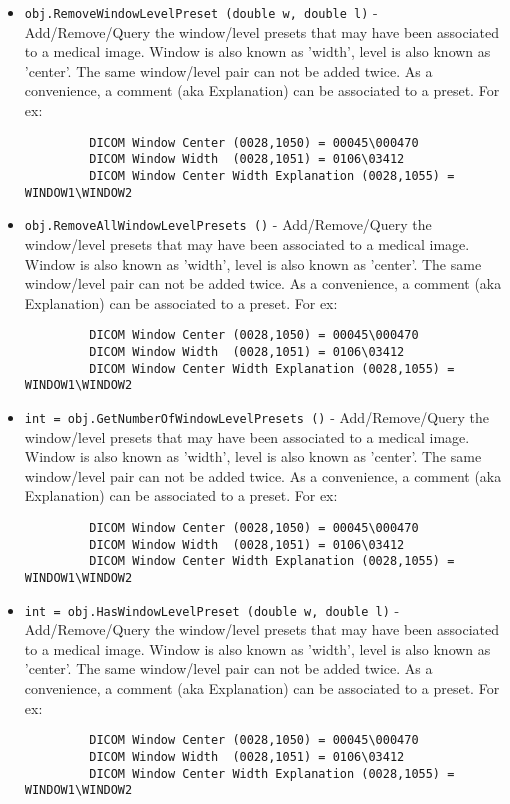 \begin{itemize}
\item  \verb|obj.RemoveWindowLevelPreset (double w, double l)| -  Add/Remove/Query the window/level presets that may have been associated
 to a medical image. Window is also known as 'width', level is also known
 as 'center'. The same window/level pair can not be added twice.
 As a convenience, a comment (aka Explanation) can be associated to
 a preset.
 For ex:
 \begin{verbatim}
         DICOM Window Center (0028,1050) = 00045\000470
         DICOM Window Width  (0028,1051) = 0106\03412
         DICOM Window Center Width Explanation (0028,1055) = WINDOW1\WINDOW2
 \end{verbatim}

\item  \verb|obj.RemoveAllWindowLevelPresets ()| -  Add/Remove/Query the window/level presets that may have been associated
 to a medical image. Window is also known as 'width', level is also known
 as 'center'. The same window/level pair can not be added twice.
 As a convenience, a comment (aka Explanation) can be associated to
 a preset.
 For ex:
 \begin{verbatim}
         DICOM Window Center (0028,1050) = 00045\000470
         DICOM Window Width  (0028,1051) = 0106\03412
         DICOM Window Center Width Explanation (0028,1055) = WINDOW1\WINDOW2
 \end{verbatim}

\item  \verb|int = obj.GetNumberOfWindowLevelPresets ()| -  Add/Remove/Query the window/level presets that may have been associated
 to a medical image. Window is also known as 'width', level is also known
 as 'center'. The same window/level pair can not be added twice.
 As a convenience, a comment (aka Explanation) can be associated to
 a preset.
 For ex:
 \begin{verbatim}
         DICOM Window Center (0028,1050) = 00045\000470
         DICOM Window Width  (0028,1051) = 0106\03412
         DICOM Window Center Width Explanation (0028,1055) = WINDOW1\WINDOW2
 \end{verbatim}

\item  \verb|int = obj.HasWindowLevelPreset (double w, double l)| -  Add/Remove/Query the window/level presets that may have been associated
 to a medical image. Window is also known as 'width', level is also known
 as 'center'. The same window/level pair can not be added twice.
 As a convenience, a comment (aka Explanation) can be associated to
 a preset.
 For ex:
 \begin{verbatim}
         DICOM Window Center (0028,1050) = 00045\000470
         DICOM Window Width  (0028,1051) = 0106\03412
         DICOM Window Center Width Explanation (0028,1055) = WINDOW1\WINDOW2
 \end{verbatim}


\end{itemize}
